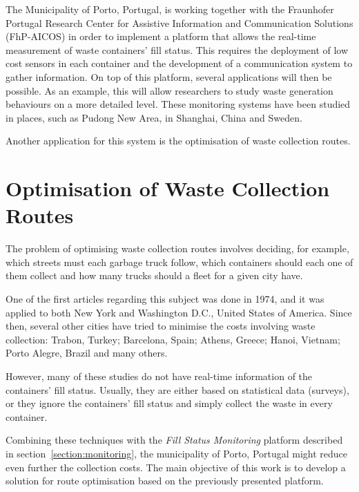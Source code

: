 The Municipality of Porto, Portugal, is working together with the Fraunhofer
Portugal Research Center for Assistive Information and Communication Solutions
(FhP-AICOS) in order to implement a platform that allows the real-time
measurement of waste containers' fill status. This requires the deployment of
low cost sensors in each container and the development of a communication
system to gather information. On top of this platform, several applications
will then be possible. As an example, this will allow researchers to study
waste generation behaviours on a more detailed level. These monitoring systems
have been studied in places, such as Pudong New Area, in Shanghai,
China\citep{Rovetta09,Vicentini09} and Sweden\citep{Johansson06}.

Another application for this system is the optimisation of waste collection
routes.

\section{Optimisation of Waste Collection Routes}

The problem of optimising waste collection routes involves deciding, for
example, which streets must each garbage truck follow, which containers should
each one of them collect and how many trucks should a fleet for a given city
have.

One of the first articles regarding this subject was done in
1974\citep{Beltrami74}, and it was applied to both New York and Washington
D.C., United States of America. Since then, several other cities have tried to
minimise the costs involving waste collection: Trabon,
Turkey\citep{Apaydin2007}; Barcelona, Spain\citep{Bautista2004}; Athens,
Greece\citep{Karadimas2005}; Hanoi, Vietnam\citep{Tung2000}; Porto Alegre,
Brazil\citep{Li2008} and many others. 

However, many of these studies do not have real-time information of the
containers' fill status. Usually, they are either based on statistical data
(surveys), or they ignore the containers' fill status and simply collect the
waste in every container.

Combining these techniques with the \textit{Fill Status Monitoring} platform
described in section~\ref{section:monitoring}, the municipality of Porto,
Portugal might reduce even further the collection costs. The main objective of
this work is to develop a solution for route optimisation based on the
previously presented platform.



